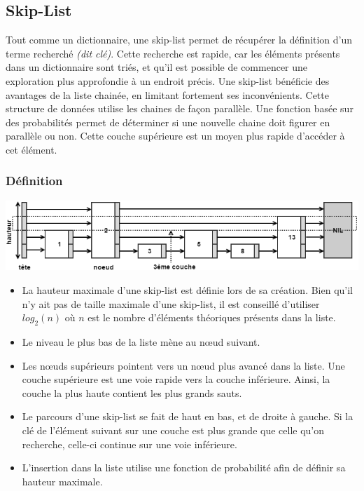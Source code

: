 \documentclass[hidelinks,a4paper, 12pt]{article}
\begin{document}
	
	\newpage
	\subsection{Skip-List}
	Tout comme un dictionnaire, une skip-list permet de récupérer la définition d'un terme recherché \textit{(dit clé)}. Cette recherche est rapide, car les éléments présents dans un dictionnaire sont triés, et qu'il est possible de commencer une exploration plus approfondie à un endroit précis.
	 Une skip-list bénéficie des avantages de la liste chainée, en limitant fortement ses inconvénients. Cette structure de données utilise les chaines de façon parallèle. Une fonction basée sur des probabilités permet de déterminer si une nouvelle chaine doit figurer en parallèle ou non. Cette couche supérieure est un moyen plus rapide d'accéder à cet élément.
	\subsubsection*{Définition}
	
	\begin{center}
		\includegraphics[width=\textwidth]{img/struct} %
	\end{center}
	
	\begin{itemize}
		\item La hauteur maximale d'une skip-list est définie lors de sa création. Bien qu'il n'y ait pas de taille maximale d'une skip-list, il est conseillé d'utiliser $log_2(n)$ où $n$ est le nombre d'éléments théoriques présents dans la liste. 
		\item Le niveau le plus bas de la liste mène au nœud suivant. %
		\item Les nœuds supérieurs pointent vers un nœud plus avancé dans la liste.  Une couche supérieure est une voie rapide vers la couche inférieure. Ainsi, la couche la plus haute contient les plus grands sauts.
		\item Le parcours d'une skip-list se fait de haut en bas, et de droite à gauche. Si la clé de l'élément suivant sur une couche est plus grande que celle qu'on recherche, celle-ci continue sur une voie inférieure.
		\item L'insertion dans la liste utilise une fonction de probabilité afin de définir sa hauteur maximale.
	\end{itemize}
	
\end{document}
